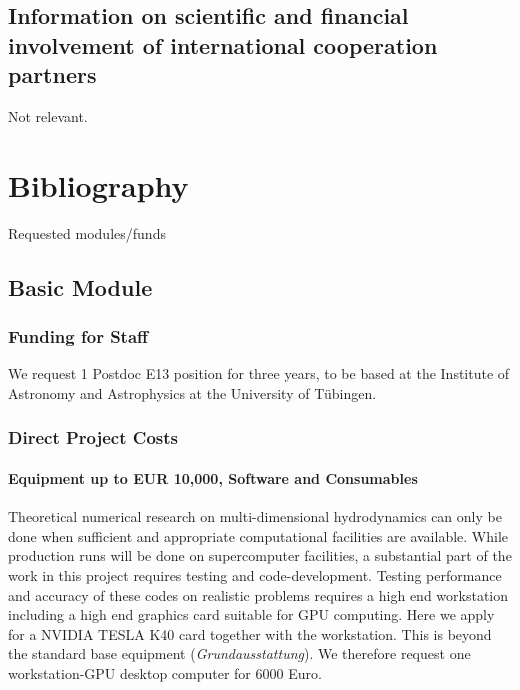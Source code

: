 \documentclass[10pt,fleqn,twoside]{article}
\begin{document}
\subsection{Information on scientific and financial involvement of international cooperation partners}
Not relevant.

\section{Bibliography}

\begingroup
\renewcommand{\section}[2]{}%
%


\endgroup


\section{Requested modules/funds}
\renewcommand{\leftmark}{\sc Requested modules/funds}

\subsection{Basic Module}

\subsubsection{Funding for Staff}

We request 1 Postdoc E13 position for three years, to be based at the Institute of Astronomy
and Astrophysics at the University of T\"ubingen.

\subsubsection{Direct Project Costs}

\paragraph{Equipment up to EUR 10,000, Software and Consumables}
Theoretical numerical research on multi-dimensional hydrodynamics can only be done when sufficient and
appropriate computational facilities are available. While production runs
will be done on supercomputer facilities, a substantial part of the work in
this project requires testing and code-development.
Testing performance and accuracy of these codes on realistic problems
requires a high end workstation including a high end graphics card suitable for
GPU computing. Here we apply for a NVIDIA TESLA K40 card together with the workstation.
This is beyond the standard base equipment (\textit{Grundausstattung}).
We therefore request one workstation-GPU desktop computer for 6000 Euro.
\end{document}

